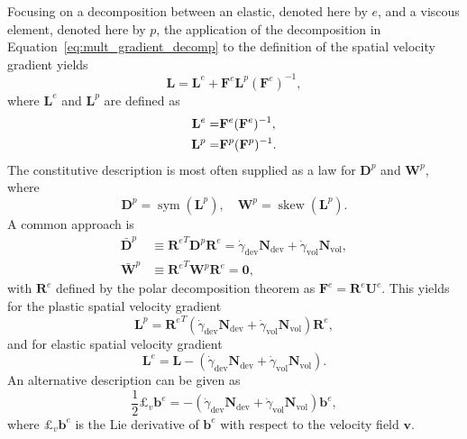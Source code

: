 Focusing on a decomposition between an elastic, denoted here by $e$, and a viscous element, denoted here by $p$, the application of the decomposition in Equation~\eqref{eq:mult_gradient_decomp} to the definition of the spatial velocity gradient yields
\begin{equation}
	\mathbf L = \mathbf L^e + \mathbf F^e \mathbf L^p (\mathbf F^e)^{-1},
\end{equation}
where $\mathbf L^e$ and $\mathbf L^p$ are defined as
\begin{align}
	\mathbf L^e =&  \do{\mathbf F}^e(\mathbf F^e)^{-1},\\
	\mathbf L^p =&  \do{\mathbf F}^p(\mathbf F^p)^{-1}.
\end{align}
The constitutive description is most often supplied as a law for $\mathbf D^p$ and $\mathbf W^p$, where
\begin{equation}
	\mathbf D^p = \operatorname{sym}(\mathbf L^p),\quad \mathbf W^p = \operatorname{skew}(\mathbf L^p).
\end{equation}
A common approach is \citep{desouzanetoComputationalMethodsPlasticity2008}
\begin{align}
  \label{eq:rate_plasticity_de_souza}
	\bar{\mathbf D}^p &\equiv  {\mathbf R^e}^T \mathbf D^p \mathbf R^e  = \dot\gamma_\text{dev} \mathbf N_\text{dev} + \dot\gamma_\text{vol} \mathbf N_\text{vol},\\
	\bar{\mathbf W}^p &\equiv {\mathbf R^e}^T \mathbf W^p \mathbf R^e = \bm 0,
\end{align}
with $\mathbf R^e$ defined by the polar decomposition theorem as $\mathbf F^e = \mathbf R^e\mathbf U^e$.
This yields for the plastic spatial velocity gradient
\begin{equation}
	\mathbf L^p = {\mathbf R^e}^T(\dot\gamma_\text{dev} \mathbf N_\text{dev} + \dot\gamma_\text{vol} \mathbf N_\text{vol})\mathbf R^e,
\end{equation}
and for elastic spatial velocity gradient
\begin{equation}
	\mathbf L^e = \mathbf L - (\dot\gamma_\text{dev} \mathbf N_\text{dev} + \dot\gamma_\text{vol} \mathbf N_\text{vol}).
\end{equation}
An alternative description can be given as
\begin{equation}
  \label{eq:flow_rule_lie_derivative}
	\frac{1}{2}£_v \mathbf b^e = -(\dot\gamma_\text{dev} \mathbf N_\text{dev} + \dot\gamma_\text{vol} \mathbf N_\text{vol})\mathbf b^e,
\end{equation}
where $£_v \mathbf b^e$ is the Lie derivative of $\mathbf b^e$ with respect to the velocity field $\bm v$.

